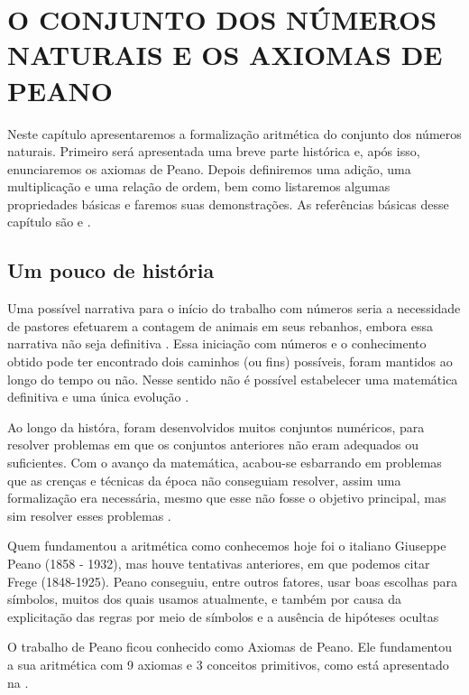 \documentclass[../main.tex]{subfiles}
\begin{document}
\chapter{O CONJUNTO DOS NÚMEROS NATURAIS E OS AXIOMAS DE PEANO}\label{cap-naturais}
 
Neste capítulo apresentaremos a formalização aritmética do conjunto dos números naturais. Primeiro será apresentada uma breve parte histórica e, após isso, enunciaremos os axiomas de Peano. Depois definiremos uma adição, uma multiplicação e uma relação de ordem, bem como listaremos algumas propriedades básicas e faremos suas demonstrações. As referências básicas desse capítulo são \textcite{domingues-2009} e \textcite{ferreira}.

\section{Um pouco de história}

Uma possível narrativa para o início do trabalho com números seria a necessidade de pastores efetuarem a contagem de animais em seus rebanhos, embora essa narrativa não seja definitiva \Cite{roque}. Essa iniciação com números e o conhecimento obtido pode ter encontrado dois caminhos (ou fins) possíveis, foram mantidos ao longo do tempo ou não. Nesse sentido não é possível estabelecer uma matemática definitiva e uma única evolução \Cite[p. 35]{roque}. 

Ao longo da históra, foram desenvolvidos muitos conjuntos numéricos, para resolver problemas em que os conjuntos anteriores não eram adequados ou suficientes. 
Com o avanço da matemática, acabou-se esbarrando em problemas que as crenças e técnicas da época não conseguiam resolver, assim uma formalização era necessária, mesmo que esse não fosse o objetivo principal, mas sim resolver esses problemas \Cite[p. 407]{roque}.

Quem fundamentou a aritmética como conhecemos hoje foi o italiano Giuseppe Peano (1858 - 1932), mas houve tentativas anteriores, em que podemos citar Frege (1848-1925). 
Peano conseguiu, entre outros fatores, usar boas escolhas para símbolos, muitos dos quais usamos atualmente, e também por causa da explicitação das regras por meio de símbolos e a ausência de hipóteses ocultas \Cite[p. 415]{boyer}

O trabalho de Peano ficou conhecido como Axiomas de Peano. Ele fundamentou a sua aritmética com 9 axiomas e 3 conceitos primitivos, como está apresentado na .
\end{document}
